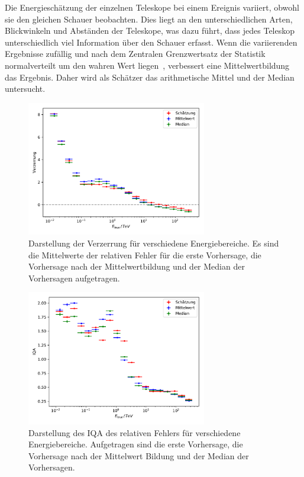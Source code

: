 Die Energieschätzung der einzelnen Teleskope bei einem Ereignis variiert, obwohl sie den gleichen Schauer beobachten.
Dies liegt an den unterschiedlichen Arten, Blickwinkeln und Abständen der Teleskope, was dazu führt, dass jedes Teleskop unterschiedlich viel Information über den
Schauer erfasst.
Wenn die variierenden Ergebnisse zufällig und nach dem Zentralen Grenzwertsatz der Statistik normalverteilt um den
wahren Wert liegen~\cite[10]{zufall_Fehler}, verbessert eine Mittelwertbildung das Ergebnis.
Daher wird als Schätzer das arithmetische Mittel und der Median untersucht.
\begin{figure}
  \includegraphics[width=0.7\textwidth]{Plots/RF_mean_bias.pdf}
  \centering
  \caption{Darstellung der Verzerrung für verschiedene Energiebereiche. Es sind die Mittelwerte der relativen Fehler für die erste Vorhersage, die Vorhersage
          nach der Mittelwertbildung und der Median der Vorhersagen aufgetragen.}
  \label{abb:mean_median_bias}
\end{figure}
\begin{figure}
  \includegraphics[width=0.7\textwidth]{Plots/RF_mean_resolution.pdf}
  \centering
  \caption{Darstellung des IQA des relativen Fehlers für verschiedene Energiebereiche. Aufgetragen sind die erste Vorhersage, die Vorhersage
          nach der Mittelwert Bildung und der Median der Vorhersagen.}
  \label{abb:mean_median_IQA}
\end{figure}

